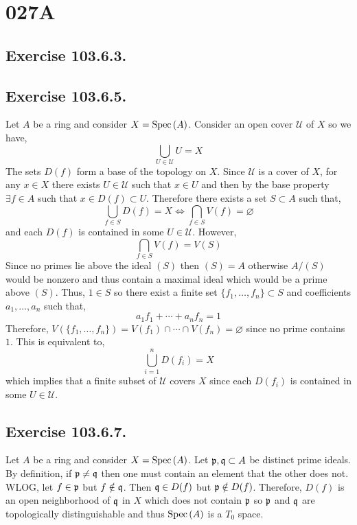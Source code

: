 \documentclass[12pt]{article}
\begin{document}

\section{027A}

\subsection{Exercise 103.6.3.}

\subsection{Exercise 103.6.5.}

Let $A$ be a ring and consider $X = \mathrm{Spec}\left( A \right)$. Consider an open cover $\mathcal{U}$ of $X$ so we have,
\[ \bigcup_{U \in \mathcal{U}} U = X \]
The sets $D(f)$ form a base of the topology on $X$. Since $\mathcal{U}$ is a cover of $X$, for any $x \in X$ there exists $U \in \mathcal{U}$ such that $x \in U$ and then by the base property $\exists f \in A$ such that $x \in D(f) \subset U$. Therefore there exists a set $S \subset A$ such that,
\[ \bigcup_{f \in S} D(f) = X \iff \bigcap_{f \in S} V(f) = \varnothing \]
and each $D(f)$ is contained in some $U \in \mathcal{U}$. However,
\[ \bigcap_{f \in S} V(f) = V(S) \]
Since no primes lie above the ideal $(S)$ then $(S) = A$ otherwise $A / (S)$ would be nonzero and thus contain a maximal ideal which would be a prime above $(S)$. Thus, $1 \in S$ so there exist a finite set $\{f_1, \dots, f_n \} \subset S$ and coefficients $a_1, \dots, a_n$ such that,
\[ a_1 f_1 + \cdots + a_n f_n = 1 \] 
Therefore, $V(\{f_1, \dots, f_n \}) = V(f_1) \cap \cdots \cap V(f_n) = \varnothing$ since no prime contains $1$. This is equivalent to,
\[ \bigcup_{i = 1}^n D(f_i) = X \]
which implies that a finite subset of $\mathcal{U}$ covers $X$ since each $D(f_i)$ is contained in some $U \in \mathcal{U}$.  

\subsection{Exercise 103.6.7.}

Let $A$ be a ring and consider $X = \mathrm{Spec}\left( A \right)$. Let $\mathfrak{p}, \mathfrak{q} \subset A$ be distinct prime ideals. By definition, if $\mathfrak{p} \neq \mathfrak{q}$ then one must contain an element that the other does not. WLOG, let $f \in \mathfrak{p}$ but $f \notin \mathfrak{q}$. Then $\mathfrak{q} \in D(f)$ but $\mathfrak{p} \notin D(f)$. Therefore, $D(f)$ is an open neighborhood of $\mathfrak{q}$ in $X$ which does not contain $\mathfrak{p}$ so $\mathfrak{p}$ and $\mathfrak{q}$ are topologically distinguishable and thus $\mathrm{Spec}\left( A \right)$ is a $T_0$ space. 
\end{document}
